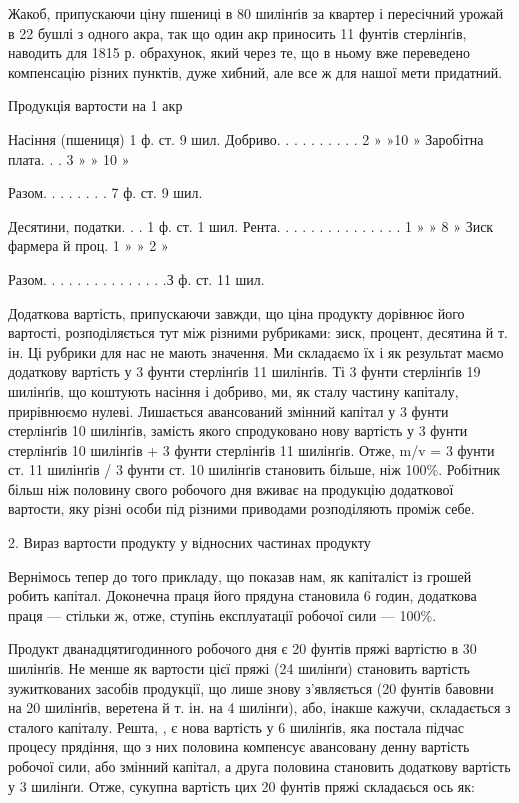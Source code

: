 Жакоб, припускаючи ціну пшениці в 80 шилінґів за квартер і пересічний урожай в 22 бушлі з одного
акра, так що один акр приносить 11 фунтів стерлінґів, наводить для 1815 р. обрахунок, який через те,
що в ньому вже переведено компенсацію різних
пунктів, дуже хибний, але все ж для нашої мети придатний.

Продукція вартости на 1 акр

Насіння (пшениця) 1 ф. ст. 9 шил.
Добриво. . . . . . . . . . 2  » »10 »
Заробітна плата. . . 3 » »  10 »

Разом. . . . . . .  . 7 ф. ст. 9 шил.

Десятини, податки. . . 1 ф. ст. 1 шил.
Рента. . . . . . . . . . . . . . . 1 » » 8 »
Зиск фармера й проц. 1 » » 2 »

Разом. . . . . . . . . . . . . . .З ф. ст. 11 шил.

Додаткова вартість, припускаючи завжди, що ціна продукту дорівнює його вартості, розподіляється тут
між різними рубриками: зиск, процент, десятина й т. ін. Ці рубрики для нас не мають значення. Ми
складаємо їх і як результат маємо додаткову вартість у 3 фунти стерлінґів 11 шилінґів. Ті 3 фунти
стерлінґів 19 шилінґів, що коштують насіння і добриво, ми, як сталу частину капіталу, прирівнюємо
нулеві. Лишається авансований змінний капітал у 3 фунти стерлінґів 10 шилінґів, замість якого
спродуковано нову вартість у 3 фунти стерлінґів 10 шилінґів + 3 фунти стерлінґів 11 шилінґів. Отже,
m/v = 3 фунти ст. 11 шилінґів / 3 фунти ст. 10 шилінґів становить більше, ніж 100\%. Робітник більш
ніж половину свого робочого дня вживає на продукцію додаткової вартости, яку різні особи під різними
приводами  розподіляють проміж себе.

2. Вираз вартости продукту у відносних частинах продукту

Вернімось тепер до того прикладу, що показав нам, як капіталіст із грошей робить капітал. Доконечна
праця його прядуна
становила 6 годин, додаткова праця — стільки ж, отже, ступінь експлуатації робочої сили — 100\%.

Продукт дванадцятигодинного робочого дня є 20 фунтів пряжі вартістю в 30 шилінґів. Не менше як 
вартости цієї пряжі (24 шилінґи) становить вартість зужиткованих засобів продукції, що лише знову
з’являється (20 фунтів бавовни на 20 шилінґів, веретена й т. ін. на 4 шилінґи), або, інакше кажучи,
складається з сталого капіталу. Решта, , є нова вартість у 6 шилінґів, яка постала підчас
процесу прядіння, що з них половина компенсує авансовану денну вартість робочої сили, або змінний
капітал, а друга половина становить додаткову вартість у 3 шилінґи. Отже, сукупна вартість цих 20
фунтів пряжі складаєься ось як: